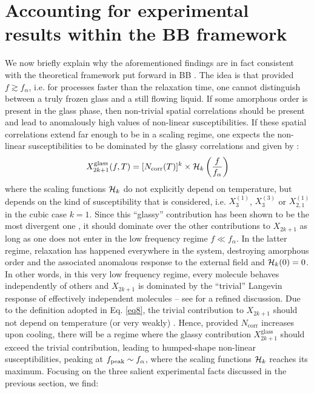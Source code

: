 \documentclass[single column,pre]{revtex4}
\begin{document}
\section{Accounting for experimental results within the BB framework \label{part3}}

We now briefly explain why the aforementioned findings are in fact consistent with the theoretical framework put forward in BB \cite{Bou05}. The idea is that provided 
$f \gtrsim
 f_\alpha$, i.e. for processes faster than the relaxation time, one cannot distinguish between a truly frozen glass and a still flowing liquid. If some amorphous order is present in the glass phase, then non-trivial spatial correlations should be present and lead to anomalously high values of non-linear susceptibilities. If these spatial correlations extend far enough to be in a scaling regime, one expects the non-linear susceptibilities to be dominated by the glassy correlations and given by \cite{Bou05,Alb16}: 
\begin{equation}
X_{2k+1}^{\mathrm{glass}}(f,T) = [N_{\text{corr}}(T)]^k \times {\cal H}_k\left(\frac{f}{f_\alpha}\right)
\label{eq18}
\end{equation}
where the scaling functions ${\cal H}_k$ do not explicitly depend on temperature, but depends on the kind of susceptibility that is considered, i.e. $X_3^{(1)}$, $X_3^{(3)}$ 
or $X_{2,1}^{(1)}$ in the cubic case $k=1$. Since this ``glassy'' contribution has been shown to be the most divergent one \cite{Bou05,Tar10}, it should dominate over the other contributions to $X_{2k+1}$ as long as one does not enter in the low frequency regime $f \ll  f_{\alpha}$. In the latter regime, relaxation has happened everywhere in the system, 
destroying amorphous order \cite{note2} and the associated anomalous response to the external field and ${\cal H}_k(0)=0$. In other words, in this very low frequency regime, every molecule behaves independently of others and $X_{2k+1}$ is dominated by the ``trivial'' Langevin response of effectively independent molecules -- see \cite{note1} for a refined discussion. Due to the definition adopted in Eq. \ref{eq8}, the trivial contribution to $X_{2k+1}$ should not depend on temperature (or very weakly) . Hence, provided $N_{\text{corr}}$ increases upon cooling, there will be a regime where the glassy contribution $X_{2k+1}^{\mathrm{glass}}$ should exceed the trivial contribution, leading to humped-shape non-linear susceptibilities, peaking at $f_{\text{\text{peak}}} \sim f_\alpha$, where the scaling functions ${\cal H}_k$ reaches its maximum. Focusing on the three salient experimental facts discussed in the previous section, we find:
\end{document}
